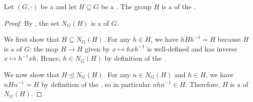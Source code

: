 \begin{proposition} \label{proposition:subgroup_of_a_group_is_normal_subgroup_of_normalizer}
    Let $(G,\cdot)$ be a  and let $H \subseteq G$ be a . The group $H$ is a  of the .
\end{proposition}

\begin{proof}
    By , the set $N_G(H)$ is a  of $G$.

    We first show that $H \subseteq N_G(H)$. For any $h \in H$, we have $h H h^{-1} = H$ because $H$ is a  of $G$: the map $H \to H$ given by $x \mapsto h x h^{-1}$ is well-defined and has inverse $x \mapsto h^{-1} x h$. Hence, $h \in N_G(H)$ by definition of the .

    We now show that $H \trianglelefteq N_G(H)$. For any $n \in N_G(H)$ and $h \in H$, we have $n H n^{-1} = H$ by definition of the , so in particular $n h n^{-1} \in H$. Therefore, $H$ is a  of $N_G(H)$.
\end{proof}

